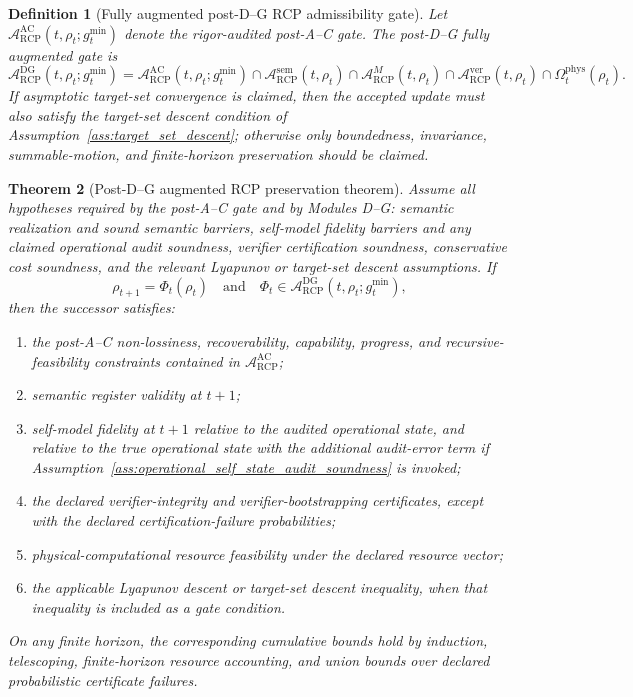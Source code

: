 \documentclass[11pt]{article}
\newtheorem{theorem}{Theorem}[section]
\newtheorem{definition}[theorem]{Definition}
\newcommand{\Acal}{\mathcal{A}}
\newcommand{\1}{\mathbf{1}}
\newcommand{\RCP}{\mathrm{RCP}}
\providecommand{\AC}{\mathrm{AC}}
\providecommand{\DG}{\mathrm{DG}}
\providecommand{\sem}{\mathrm{sem}}
\providecommand{\phys}{\mathrm{phys}}
\providecommand{\ver}{\mathrm{ver}}
\begin{document}
\begin{definition}[Fully augmented post-D--G RCP admissibility gate]
\label{def:fully_augmented_rcp_gate_D_G}
Let \(\Acal_{\RCP}^{\AC}(t,\rho_t;g_t^{\min})\) denote the rigor-audited post-A--C gate.  The post-D--G fully augmented gate is
\[
\Acal_{\RCP}^{\DG}(t,\rho_t;g_t^{\min})
=
\Acal_{\RCP}^{\AC}(t,\rho_t;g_t^{\min})
\cap
\Acal^{\sem}_{\RCP}(t,\rho_t)
\cap
\Acal^{M}_{\RCP}(t,\rho_t)
\cap
\Acal^{\ver}_{\RCP}(t,\rho_t)
\cap
\Omega_t^{\phys}(\rho_t).
\]
If asymptotic target-set convergence is claimed, then the accepted update must also satisfy the target-set descent condition of Assumption~\ref{ass:target_set_descent}; otherwise only boundedness, invariance, summable-motion, and finite-horizon preservation should be claimed.
\end{definition}

\begin{theorem}[Post-D--G augmented RCP preservation theorem]
\label{thm:post_D_G_augmented_rcp_preservation}
Assume all hypotheses required by the post-A--C gate and by Modules D--G: semantic realization and sound semantic barriers, self-model fidelity barriers and any claimed operational audit soundness, verifier certification soundness, conservative cost soundness, and the relevant Lyapunov or target-set descent assumptions.  If
\[
\rho_{t+1}=\Phi_t(\rho_t)
\quad\text{and}\quad
\Phi_t\in\Acal_{\RCP}^{\DG}(t,\rho_t;g_t^{\min}),
\]
then the successor satisfies:
\begin{enumerate}[label=(\alph*)]
    \item the post-A--C non-lossiness, recoverability, capability, progress, and recursive-feasibility constraints contained in \(\Acal_{\RCP}^{\AC}\);
    \item semantic register validity at \(t+1\);
    \item self-model fidelity at \(t+1\) relative to the audited operational state, and relative to the true operational state with the additional audit-error term if Assumption~\ref{ass:operational_self_state_audit_soundness} is invoked;
    \item the declared verifier-integrity and verifier-bootstrapping certificates, except with the declared certification-failure probabilities;
    \item physical-computational resource feasibility under the declared resource vector;
    \item the applicable Lyapunov descent or target-set descent inequality, when that inequality is included as a gate condition.
\end{enumerate}
On any finite horizon, the corresponding cumulative bounds hold by induction, telescoping, finite-horizon resource accounting, and union bounds over declared probabilistic certificate failures.
\end{theorem}
\end{document}
